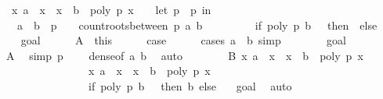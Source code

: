 \begin{isabellebody}
\ \ {\isachardoublequoteopen}{\isacharparenleft}{\isasymforall}x{\isachardot}\ a\ {\isacharless}\ x\ {\isasymand}\ x\ {\isacharless}\ b\ {\isasymlongrightarrow}\ poly\ p\ x\ {\isasymnoteq}\ {}{\isacharparenright}\ {\isasymlongleftrightarrow}\ {\isacharparenleft}let\ p\ {\isacharequal}\ p\ in\isanewline
\ \ \ {\isacharparenleft}a\ {\isasymge}\ b\ {\isasymor}\ p\ {\isasymnoteq}\ {}\ {\isasymand}\ count{\isacharunderscore}roots{\isacharunderscore}between\ p\ a\ b\ {\isacharequal}\ \isanewline
\ \ \ \ \ \ \ {\isacharparenleft}if\ poly\ p\ b\ {\isacharequal}\ {}\ then\ {}\ else\ {}{\isacharparenright}{\isacharparenright}{\isacharparenright}{\isachardoublequoteclose}\isanewline
%
\isadelimproof
%
\endisadelimproof
%
\isatagproof
{}\isamarkupfalse%
\isanewline
\ \ \isamarkupfalse%
\ goal{}\isanewline
\ \ \ \ \isamarkupfalse%
\ A\ {\isacharequal}\ this\isanewline
\ \ \ \ \isamarkupfalse%
\ {\isacharquery}case\isanewline
\ \ \ \ \isamarkupfalse%
\ {\isacharparenleft}cases\ {\isachardoublequoteopen}a\ {\isasymge}\ b{\isachardoublequoteclose}{\isacharcomma}\ simp{\isacharparenright}\isanewline
\ \ \ \ \ \ \isamarkupfalse%
\ goal{}\isanewline
\ \ \ \ \ \ \isamarkupfalse%
\ A\ \isamarkupfalse%
\ {\isacharbrackleft}simp{\isacharbrackright}{\isacharcolon}\ {\isachardoublequoteopen}p\ {\isasymnoteq}\ {}{\isachardoublequoteclose}\ \isamarkupfalse%
\ dense{\isacharbrackleft}of\ a\ b{\isacharbrackright}\ \isamarkupfalse%
\ auto\isanewline
\ \ \ \ \ \ \isamarkupfalse%
\ B{\isacharcolon}\ {\isachardoublequoteopen}{\isacharbraceleft}x{\isachardot}\ a\ {\isacharless}\ x\ {\isasymand}\ x\ {\isasymle}\ b\ {\isasymand}\ poly\ p\ x\ {\isacharequal}\ {}{\isacharbraceright}\ {\isacharequal}\isanewline
\ \ \ \ \ \ \ \ \ \ \ \ \ \ \ \ {\isacharbraceleft}x{\isachardot}\ a\ {\isacharless}\ x\ {\isasymand}\ x\ {\isacharless}\ b\ {\isasymand}\ poly\ p\ x\ {\isacharequal}\ {}{\isacharbraceright}\ {\isasymunion}\isanewline
\ \ \ \ \ \ \ \ \ \ \ \ \ \ \ \ {\isacharparenleft}if\ poly\ p\ b\ {\isacharequal}\ {}\ then\ {\isacharbraceleft}b{\isacharbraceright}\ else\ {\isacharbraceleft}{\isacharbraceright}{\isacharparenright}{\isachardoublequoteclose}\ \isamarkupfalse%
\ goal{}\ \isamarkupfalse%
\ auto\isanewline
\ \ \ \ \ \ \isamarkupfalse%

\end{isabellebody}
